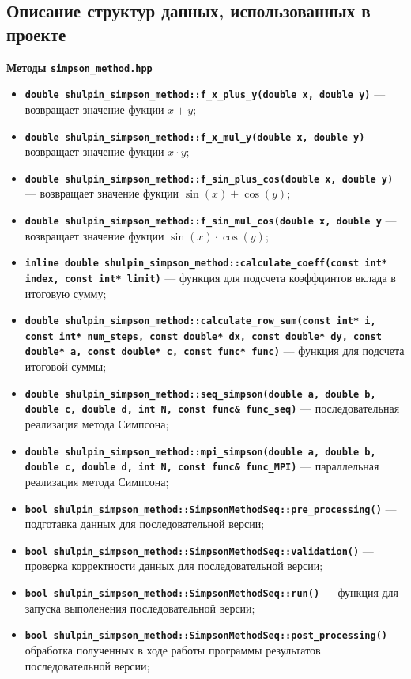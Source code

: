 \documentclass[12pt,a4paper]{article}
\begin{document}
\subsection*{Описание структур данных, использованных в проекте}
\textbf{Методы \texttt{simpson\_method.hpp}}
\begin{itemize}
    \item \textbf{\texttt{double shulpin\_simpson\_method::f\_x\_plus\_y(double x, double y)}} --- возвращает значение фукции $x + y$;
    \item \textbf{\texttt{double shulpin\_simpson\_method::f\_x\_mul\_y(double x, double y)}} --- возвращает значение фукции $x \cdot y$;
    \item \textbf{\texttt{double shulpin\_simpson\_method::f\_sin\_plus\_cos(double x, double y)}} --- возвращает значение фукции $\sin(x) + \cos(y)$;
    \item \textbf{\texttt{double shulpin\_simpson\_method::f\_sin\_mul\_cos(double x, double y}} --- возвращает значение фукции $\sin(x) \cdot \cos(y)$;
    \item \textbf{\texttt{inline double shulpin\_simpson\_method::calculate\_coeff(const int* index, const int* limit)}} --- функция для подсчета коэффцинтов вклада в итоговую сумму;
    \item \textbf{\texttt{double shulpin\_simpson\_method::calculate\_row\_sum(const int* i, const int* num\_steps, const double* dx, const double* dy, const double* a, const double* c, const func* func)}} --- функция для подсчета итоговой суммы;
    \item \textbf{\texttt{double shulpin\_simpson\_method::seq\_simpson(double a, double b, double c, double d, int N, const func\& func\_seq)}} --- последовательная реализация метода Симпсона;
    \item \textbf{\texttt{double shulpin\_simpson\_method::mpi\_simpson(double a, double b, double c, double d, int N, const func\& func\_MPI)}} --- параллельная реализация метода Симпсона;
    \item \textbf{\texttt{bool shulpin\_simpson\_method::SimpsonMethodSeq::pre\_processing()}} --- подготавка данных для последовательной версии;
    \item \textbf{\texttt{bool shulpin\_simpson\_method::SimpsonMethodSeq::validation()}} --- проверка корректности данных для последовательной версии;
    \item \textbf{\texttt{bool shulpin\_simpson\_method::SimpsonMethodSeq::run()}} --- функция для запуска выполенения последовательной версии;
    \item \textbf{\texttt{bool shulpin\_simpson\_method::SimpsonMethodSeq::post\_processing()}} --- обработка полученных в ходе работы программы результатов последовательной версии;

\end{itemize}
\end{document}
